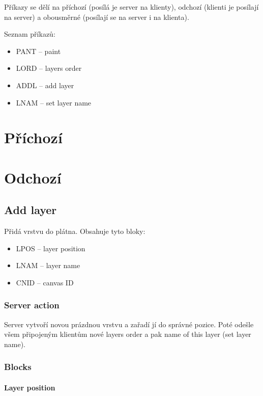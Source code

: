 \documentclass[12pt,oneside,a4paper]{report}
\begin{document}
Příkazy se dělí na příchozí (posílá je server na klienty), odchozí (klienti je posílají na server) a obousměrné (posílají se na server i na klienta).

Seznam příkazů:

\begin{itemize}
	\item PANT -- paint
	\item LORD -- layers order
	\item ADDL -- add layer
	\item LNAM -- set layer name
\end{itemize}

\section{Příchozí}

\section{Odchozí}

\subsection{Add layer}

Přidá vrstvu do plátna. Obsahuje tyto bloky:

\begin{itemize}
	\item LPOS -- layer position
	\item LNAM -- layer name
	\item CNID -- canvas ID
\end{itemize}

\subsubsection{Server action}

Server vytvoří novou prázdnou vrstvu a zařadí jí do správné pozice. Poté odešle všem připojeným klientům nové layers order a pak name of this layer (set layer name).

\subsubsection{Blocks}

\paragraph{Layer position}
\end{document}
